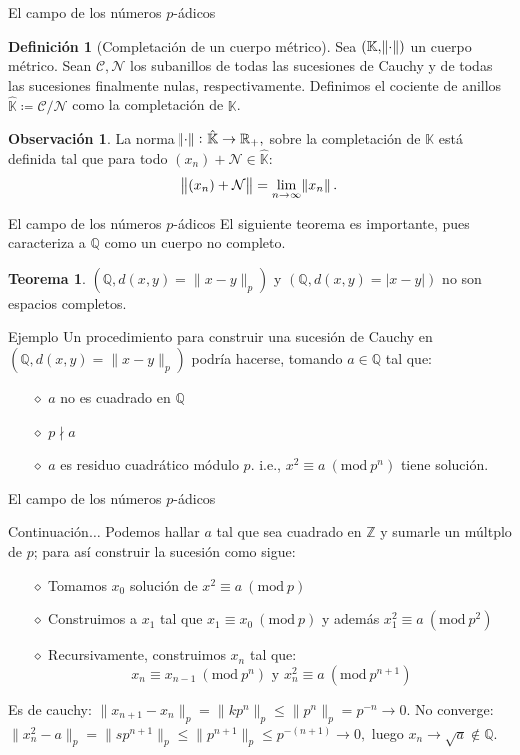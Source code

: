 \documentclass{beamer}
\newcommand{\bb}[1]{\mathbb{#1}}
\theoremstyle{definition}
\numberwithin{equation}{section}
\newcommand{\marine}[1]{\textcolor{defColor}{#1}}
\newcommand{\orangee}[1]{\textcolor{thColor}{#1}}
\newcommand{\redd}[1]{\textcolor{rkColor}{#1}}
\newtheorem{df}{\marine{Definición}}
\newtheorem{thh}{\orangee{Teorema}}
\newtheorem{rr}{\redd{Observación}}
\newcommand{\Mod}[1]{\ (\mathrm{mod}\ #1)}
\renewcommand{\leq}{\leqslant}
\newcommand{\Z}{\mathbb{Z}}
\newcommand{\R}{\mathbb{R}}
\newcommand{\Q}{\mathbb{Q}}
\newcommand{\pnorm}[1]{\|#1\|_p}
\begin{document}
\begin{frame}{El campo de los números $p$-ádicos}
\begin{df}
	[Completación de un cuerpo métrico]Sea $ (\bb{K}, \norm{\cdot})$ un cuerpo métrico. Sean $\mathcal C,\mathcal N $ los subanillos de todas las sucesiones de Cauchy y de todas las sucesiones finalmente nulas, respectivamente.  Definimos el cociente de anillos $\hat{\bb{K}}\coloneqq \mathcal C/\mathcal N  $ como la completación de $\bb{K}$.
\end{df}
\begin{rr}
	La norma $\norm{\cdot}\colon{\hat{\bb{K}}}\to\R_+,$ sobre la completación de $\bb{K}$ está definida tal que para todo $ (x_n)+\mathcal{N} \in \hat{\bb{K}}$:
	$$\norm{ (x_n)+\mathcal{N}}=\lim_{n\to\infty}\norm{x_n}.$$
\end{rr}
\end{frame}
\begin{frame}{El campo de los números $p$-ádicos}
	El siguiente teorema es importante, pues caracteriza a $\Q$ como un cuerpo no completo.
	\begin{thh}
		$ (\Q, d (x,y)=\pnorm{x-y})$ y $ (\Q, d (x,y)=|x-y|)$ no son espacios completos.
	\end{thh}
\begin{exampleblock}{Ejemplo}
	Un procedimiento para construir una sucesión de Cauchy en $ (\Q, d (x,y)=\pnorm{x-y})$ podría hacerse, tomando $a\in\Q$ tal que:
	\begin{itemize}
		\item[$\diamond$] $a$ no es cuadrado en $\Q$
		\item[$\diamond$] $p \nmid a$
		\item[$\diamond$] $a$ es residuo cuadrático módulo $p$. i.e., $x^2 \equiv a \Mod{p^n}$ tiene solución.
	\end{itemize}
\end{exampleblock}
\end{frame}
\begin{frame}{El campo de los números $p$-ádicos}
	\begin{exampleblock}{Continuación$\dots$}
		Podemos hallar $a$ tal que sea cuadrado en $\Z$ y sumarle un múltplo de $p$; para así construir la sucesión como sigue:
		\begin{itemize}
			\item[$\diamond$] Tomamos $x_0$ solución de $x^2\equiv a \Mod{p}$
			\item[$\diamond$] Construimos a $x_1$ tal que $x_1 \equiv x_0 \Mod{p}$ y además ${x_1^2\equiv a \Mod{p^2}}$ 
			\item[$\diamond$] Recursivamente, construimos $x_n$ tal que:
			$$x_n \equiv x_{n-1} \Mod{p^n} \text{ y } {x_n^2\equiv a \Mod{p^{n+1}}}$$
		\end{itemize}
	Es de cauchy: $  \pnorm{x_{n+1}-x_n} = \pnorm{kp^n} \leq \pnorm{p^n}=p^{-n}\rightarrow0.$\linebreak
	No converge: $\pnorm{x_n^2-a}=\pnorm{sp^{n+1}}\leq \pnorm{p^{n+1}}\leq p^{- (n+1)}\to 0,$
	luego $x_n\to \sqrt{a}\notin\Q$.
	\end{exampleblock}
\end{frame}
\end{document}
